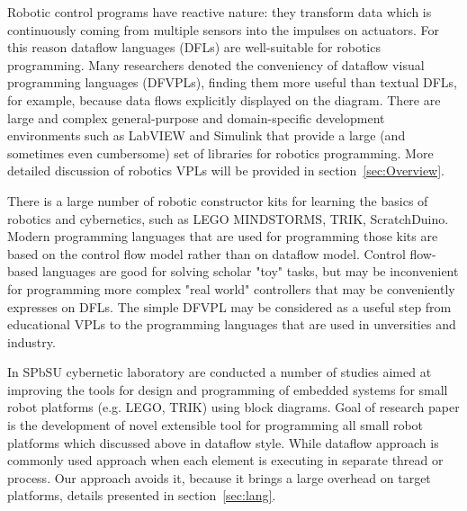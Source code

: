 \documentclass[conference,compsoc]{IEEEtran}
\begin{document}
Robotic control programs have reactive nature: they transform data which is continuously coming from multiple sensors into the impulses on actuators. For this reason dataflow languages (DFLs) are well-suitable for robotics programming. Many researchers denoted the conveniency of dataflow visual programming languages (DFVPLs)\cite{johnston2004advances}, finding them more useful than textual DFLs, for example, because data flows explicitly displayed on the diagram. There are large and complex general-purpose and domain-specific development environments such as LabVIEW\cite{labview} and Simulink\cite{simulink} that provide a large (and sometimes even cumbersome) set of libraries for robotics programming. More detailed discussion of robotics VPLs will be provided in section~\ref{sec:Overview}.

There is a large number of robotic constructor kits for learning the basics of robotics and cybernetics, such as LEGO MINDSTORMS\cite{legokit}, TRIK, ScratchDuino\cite{http://www.scratchduino.com/}. Modern programming languages that are used for programming those kits are based on the control flow model rather than on dataflow model. Control flow-based languages are good for solving scholar "toy" tasks, but may be inconvenient for programming more complex "real world" controllers that may be conveniently expresses on DFLs. The simple DFVPL may be considered as a useful step from educational VPLs to the programming languages that are used in unversities and industry. 



In SPbSU cybernetic laboratory are conducted a number of studies aimed at improving the tools for design and programming of embedded systems for small robot platforms (e.g. LEGO, TRIK) using block diagrams\cite{}. Goal of research paper is the development of novel extensible tool for programming all small robot platforms which discussed above in dataflow style. While dataflow approach is commonly used approach when each element is executing in separate thread or process. Our approach avoids it, because it brings a large overhead on target platforms, details presented in section~\ref{sec:lang}.
\end{document}
